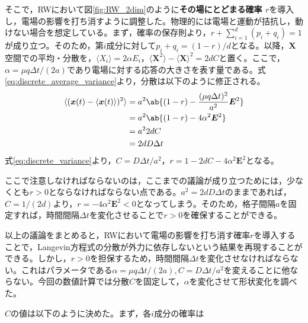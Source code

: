 \documentclass[autodetect-engine,dvi=dvipdfmx,a4paper,ja=standard,oneside,openany,11pt,draft]{bxjsbook}
\begin{document}
そこで，RWにおいて図\ref{fig:RW_2dim}のように\textbf{その場にとどまる確率 $r$}を導入し，電場の影響を打ち消すように調整した。物理的には電場と運動が拮抗し，動けない場合を想定している。まず，確率の保存則より，$r+\sum_{i=1}^{d}(p_i+q_i) =1$が成り立つ。そのため，第$i$成分に対して$p_i+q_i=(1-r)/d$となる。以降，$\bm{X}$空間での平均・分散を，$\langle X_i\rangle=2\alpha E_i$，$\langle\bm{X}^2\rangle-\langle\bm{X}\rangle^2=2dC$と置く。ここで，$\alpha=\mu q\Delta t/(2a)$であり電場に対する応答の大きさを表す量である。式\ref{eq:discrete_average_variance}より，分散は以下のように修正される。
\begin{equation}
  \begin{split}
    \langle(\bm{x}(t)-\langle\bm{x}(t)\rangle)^2\rangle & =a^2\ab\{(1-r)-\frac{(\mu q \Delta t)^2}{a^2}\bm{E}^2\} \\
                                                        & =a^2\ab\{(1-r)-4\alpha^2\bm{E}^2\}                      \\
                                                        & =a^2 2dC                                                \\
                                                        & =2dD\Delta t
  \end{split}
  \label{eq:discrete_variance}
\end{equation}
式\ref{eq:discrete_variance}より，$C=D\Delta t/a^2$，$r=1-2dC-4\alpha^2\bm{E}^2$となる。

ここで注意しなければならないのは，ここまでの議論が成り立つためには，少なくとも$r>0$とならなければならない点である。$a^2=2dD\Delta t$のままであれば，$C=1/(2d)$より，$r=-4\alpha^2\bm{E}^2<0$となってしまう。そのため，格子間隔$a$を固定すれば，時間間隔$\Delta t$を変化させることで$r>0$を確保することができる。

以上の議論をまとめると，RWにおいて電場の影響を打ち消す確率$r$を導入することで，Langevin方程式の分散が外力に依存しないという結果を再現することができる。しかし，$r>0$を担保するため，時間間隔$\Delta t$を変化させなければならない。これはパラメータである$\alpha=\mu q\Delta t/(2a),C=D\Delta t/a^2$を変えることに他ならない。今回の数値計算では分散$C$を固定して，$\alpha$を変化させて形状変化を調べた。

$C$の値は以下のように決めた。まず，各$i$成分の確率は
\end{document}
